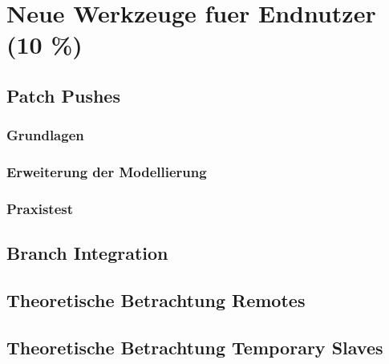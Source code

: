 \chapter{Neue Werkzeuge fuer Endnutzer (10 \%)}
\section{Patch Pushes}
\subsection{Grundlagen}
\subsection{Erweiterung der Modellierung}
\subsection{Praxistest}
\section{Branch Integration}
\section{Theoretische Betrachtung Remotes}
\section{Theoretische Betrachtung Temporary Slaves}

